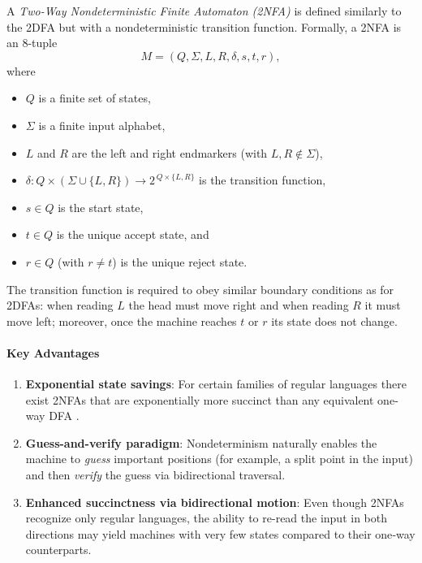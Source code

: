 A \emph{Two-Way Nondeterministic Finite Automaton (2NFA)} is defined similarly to the 2DFA but with a nondeterministic transition function. Formally, a 2NFA is an 8-tuple
\[
M = (Q, \Sigma, L, R, \delta, s, t, r),
\]
where
\begin{itemize}
    \item \(Q\) is a finite set of states,
    \item \(\Sigma\) is a finite input alphabet,
    \item \(L\) and \(R\) are the left and right endmarkers (with \(L,R\notin\Sigma\)),
    \item \(\delta: Q \times (\Sigma \cup \{L,R\}) \to 2^{\,Q \times \{L,R\}}\) is the transition function,
    \item \(s\in Q\) is the start state,
    \item \(t\in Q\) is the unique accept state, and
    \item \(r\in Q\) (with \(r\neq t\)) is the unique reject state.
\end{itemize}
The transition function is required to obey similar boundary conditions as for 2DFAs: when reading \(L\) the head must move right and when reading \(R\) it must move left; moreover, once the machine reaches \(t\) or \(r\) its state does not change.

\paragraph{Key Advantages}
\begin{enumerate}
    \item \textbf{Exponential state savings}: For certain families of regular languages there exist 2NFAs that are exponentially more succinct than any equivalent one‐way DFA \cite{yakaryilmaz2010succinctness}. 
    \item \textbf{Guess-and-verify paradigm}: Nondeterminism naturally enables the machine to \emph{guess} important positions (for example, a split point in the input) and then \emph{verify} the guess via bidirectional traversal.
    \item \textbf{Enhanced succinctness via bidirectional motion}: Even though 2NFAs recognize only regular languages, the ability to re-read the input in both directions may yield machines with very few states compared to their one‐way counterparts.
\end{enumerate}

